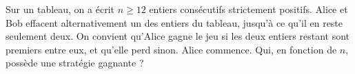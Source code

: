 Sur un tableau, on a écrit $n \geq 12$ entiers consécutifs strictement positifs. Alice et Bob effacent alternativement un des entiers du tableau, jusqu'à ce qu'il en reste seulement deux. On convient qu'Alice gagne le jeu si les deux entiers restant sont premiers entre eux, et qu'elle perd sinon. Alice commence. Qui, en fonction de $n$, possède une stratégie gagnante ?
